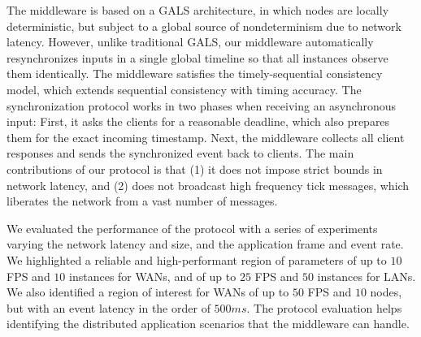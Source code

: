\documentclass[sigplan,screen]{acmart}
\begin{document}
The middleware is based on a GALS architecture, in which nodes are locally
deterministic, but subject to a global source of nondeterminism due to network
latency.
However, unlike traditional GALS, our middleware automatically resynchronizes
inputs in a single global timeline so that all instances observe them
identically.
The middleware satisfies the timely-sequential consistency model, which extends
sequential consistency with timing accuracy.
The synchronization protocol works in two phases when receiving an asynchronous
input:
First, it asks the clients for a reasonable deadline, which also prepares them
for the exact incoming timestamp.
Next, the middleware collects all client responses and sends the synchronized
event back to clients.
The main contributions of our protocol is that (1) it does not impose strict
bounds in network latency, and (2) does not broadcast high frequency tick
messages, which liberates the network from a vast number of messages.

We evaluated the performance of the protocol with a series of experiments
varying the network latency and size, and the application frame and event rate.
%
We highlighted a reliable and high-performant region of parameters of up to
$10$ FPS and $10$ instances for WANs, and of up to $25$ FPS and $50$ instances
for LANs.
We also identified a region of interest for WANs of up to $50$ FPS and $10$
nodes, but with an event latency in the order of $500ms$.
%
The protocol evaluation helps identifying the distributed application scenarios
that the middleware can handle.



\end{document}
